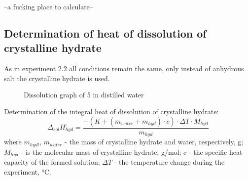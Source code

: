 \documentclass[12pt, letterpaper]{article}
\begin{document}
        --a fucking place to calculate--
       


        \subsection{Determination of heat of dissolution of crystalline hydrate}
        As in experiment 2.2 all conditions remain the same, only instead of anhydrous salt the crystalline hydrate is used.
        \begin{figure}[h]
            \centering
             \caption{Dissolution graph of 5  in distilled water}
        \end{figure}
        Determination of the integral heat of dissolution of crystalline hydrate:
         \begin{equation}
            \Delta_{sol}H^\circ_{hyd} = \frac{-(K + (m_{water} + m_{hyd}) \cdot c) \cdot \Delta T \cdot M_{hyd}}{m_{hyd}}
        \end{equation}
         where $ m_{hydl}$, $m_{water}$ - the mass of crystalline hydrate  and water, respectively, g; $M_{hyd}$ - is the molecular mass of crystalline hydrate, g/mol; c - the specific heat capacity of the formed solution; $\Delta T$ - the temperature change during the experiment, °C. \\
\end{document}
